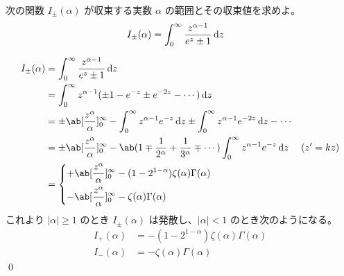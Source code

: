 \documentclass[uplatex,dvipdfmx,a4paper,11pt]{jlreq}
\makeatletter
\numberwithin{equation}{section}
\theoremstyle{definition}
\renewenvironment{proof}[1][\proofname]{\par
  \normalfont
  \topsep6\p@\@plus6\p@ \trivlist
  \item[\hskip\labelsep{\bfseries #1}\@addpunct{\bfseries}]\ignorespaces\quad\par
}{%
  \qed\endtrivlist\@endpefalse
}
\renewcommand\proofname{証明}
\makeatother
\begin{document}
\begin{problem}
次の関数 $I_\pm(\alpha)$ が収束する実数 $\alpha$ の範囲とその収束値を求めよ。
\begin{align}
  I_\pm(\alpha) & = \int_0^\infty\frac{z^{\alpha - 1}}{e^z \pm 1}\dl{z}
\end{align}
\end{problem}
\begin{proof}
  \begin{align}
    I_\pm(\alpha) & = \int_0^\infty\frac{z^{\alpha - 1}}{e^z \pm 1}\dl{z}                                                                                                          \\
                  & = \int_0^\infty z^{\alpha - 1}(\pm 1 - e^{-z} \pm e^{-2z} - \cdots)\dl{z}                                                                                      \\
                  & = \pm\ab[\frac{z^\alpha}{\alpha}]_0^\infty - \int_0^\infty z^{\alpha - 1}e^{-z}\dl{z} \pm \int_0^\infty z^{\alpha - 1}e^{-2z}\dl{z} - \cdots                   \\
                  & = \pm\ab[\frac{z^\alpha}{\alpha}]_0^\infty - \ab(1 \mp \frac{1}{2^\alpha} + \frac{1}{3^\alpha} \mp \cdots)\int_0^\infty z^{\alpha - 1}e^{-z}\dl{z} & (z' = kz) \\
                  & = \begin{dcases}
                        +\ab[\frac{z^\alpha}{\alpha}]_0^\infty - (1 - 2^{1 - \alpha})\zeta(\alpha)\Gamma(\alpha) \\
                        -\ab[\frac{z^\alpha}{\alpha}]_0^\infty - \zeta(\alpha)\Gamma(\alpha)                     \\
                      \end{dcases}
  \end{align}
  これより $|\alpha| \geq 1$ のとき $I_{\pm}(\alpha)$ は発散し、$|\alpha| < 1$ のとき次のようになる。
  \begin{align}
    I_+(\alpha) & = - (1 - 2^{1 - \alpha})\zeta(\alpha)\Gamma(\alpha) \\
    I_-(\alpha) & = - \zeta(\alpha)\Gamma(\alpha)
  \end{align}
\end{proof}

\setcounter{subsection}{5}
\end{document}
